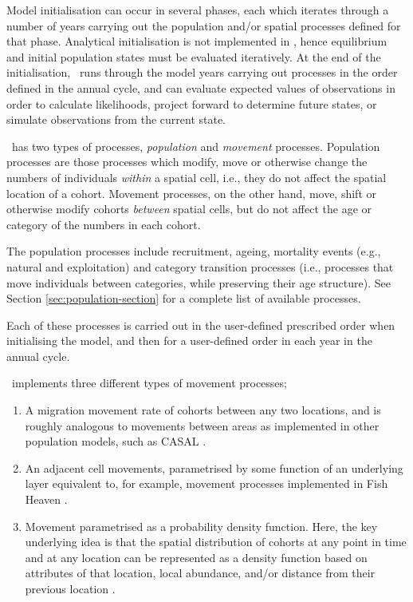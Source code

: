 Model initialisation can occur in several phases, each which iterates through a number of years carrying out the population and/or spatial processes defined for that phase. Analytical initialisation is not implemented in \SPM, hence equilibrium and initial population states must be evaluated iteratively. At the end of the initialisation, \SPM\ runs through the model years carrying out processes in the order defined in the annual cycle, and can evaluate expected values of observations in order to calculate likelihoods, project forward to determine future states, or simulate observations from the current state.

\SPM\ has two types of processes, \emph{population} and \emph{movement} processes. Population processes are those processes which modify, move or otherwise change the numbers of individuals \emph{within} a spatial cell, i.e., they do not affect the spatial location of a cohort. Movement processes, on the other hand, move, shift or otherwise modify cohorts \emph{between} spatial cells, but do not affect the age or category of the numbers in each cohort. 

The population processes include recruitment, ageing,  mortality events (e.g., natural and exploitation) and category transition processes (i.e., processes that move individuals between categories, while preserving their age structure). See Section \ref{sec:population-section} for a complete list of available processes.

Each of these processes is carried out in the user-defined prescribed order when initialising the model, and then for a user-defined order in each year in the annual cycle.

\SPM\ implements three different types of movement processes;
\begin{enumerate}
	\item  A migration movement rate of cohorts between any two locations, and is roughly analogous to movements between areas as implemented in other population models, such as CASAL \citep{1388}. 
	\item An adjacent cell movements, parametrised by some function of an underlying layer \textemdash equivalent to, for example, movement processes implemented in Fish Heaven \citep{1136,1135}.
	\item Movement parametrised as a probability density function. Here, the key underlying idea is that the spatial distribution of cohorts at any point in time and at any location can be represented as a density function based on attributes of that location, local abundance, and/or distance from their previous location \citep{1366,1367}. 
\end{enumerate}

